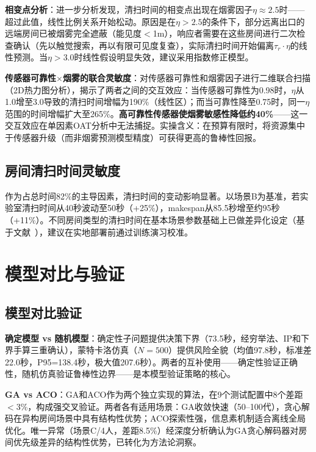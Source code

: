 \documentclass[12pt,a4paper]{ctexart}
\begin{document}
\textbf{相变点分析}：进一步分析发现，清扫时间的相变点出现在烟雾因子$\eta\approx 2.5$时——超过此值，线性比例关系开始松动。原因是在$\eta>2.5$的条件下，部分远离出口的远端房间已被烟雾完全遮蔽（能见度$<$1m），响应者需要在这些房间进行二次检查确认（先以触觉搜索，再以有限可见度复查），实际清扫时间开始偏离$\tau_r\cdot\eta$的线性预测。当$\eta>3.0$时线性假设明显失效，建议采用指数修正模型。

\textbf{传感器可靠性$\times$烟雾的联合灵敏度}：对传感器可靠性和烟雾因子进行二维联合扫描（2D热力图分析），揭示了两者之间的交互效应：当传感器可靠性为0.98时，$\eta$从1.0增至3.0导致的清扫时间增幅为190\%（线性区）；而当可靠性降至0.75时，同一$\eta$范围的时间增幅扩大至265\%。\textbf{高可靠性传感器使烟雾敏感性降低约40\%}——这一交互效应在单因素OAT分析中无法捕捉。实操含义：在预算有限时，将资源集中于传感器升级（而非烟雾预测模型精度）可获得更高的鲁棒性回报。

\subsection{房间清扫时间灵敏度}

作为占总时间82\%的主导因素，清扫时间的变动影响显著。以场景B为基准，若实验室清扫时间从40秒波动至50秒（+25\%），makespan从85.5秒增至约95秒（+11\%）。不同房间类型的清扫时间在基本场景参数基础上已做差异化设定（基于文献~\cite{lambert2021searchrescue}），建议在实地部署前通过训练演习校准。

\section{模型对比与验证}

\subsection{模型对比验证}

\textbf{确定模型 vs 随机模型}：确定性子问题提供决策下界（73.5秒，经穷举法、IP和下界手算三重确认），蒙特卡洛仿真（$N=500$）提供风险全貌（均值97.8秒，标准差22.0秒，P95=138.4秒，极大值207.6秒）。两者的互补使用——确定性验证正确性，随机仿真验证鲁棒性边界——是本模型验证策略的核心。

\textbf{GA vs ACO}：GA和ACO作为两个独立实现的算法，在9个测试配置中8个差距$<$3\%，构成强交叉验证。两者各有适用场景：GA收敛快速（50--100代），贪心解码在异构房间场景中具有结构性优势；ACO探索性强，信息素机制适合离线全局优化。唯一异常（场景C/4人，差距8.5\%）经深度分析确认为GA贪心解码器对房间优先级差异的结构性优势，已转化为方法论洞察。
\end{document}
